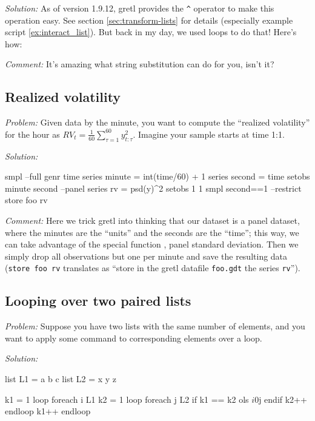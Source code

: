 \emph{Solution:} As of version 1.9.12, gretl provides the
\verb|^| operator to make this operation easy. See section
\ref{sec:transform-lists} for details (especially example script
\ref{ex:interact_list}). But back in my day, we used loops to do that!
Here's how:


\emph{Comment:} It's amazing what string substitution can do for
you, isn't it?

\subsection{Realized volatility}

\emph{Problem:} Given data by the minute, you want to compute the
``realized volatility'' for the hour as $RV_t = 
\sum_{}^{60} y_{t:\tau}^2$. Imagine your sample starts at time 1:1.

\emph{Solution:}
\begin{code}
smpl --full
genr time
series minute = int(time/60) + 1
series second = time %
setobs minute second --panel
series rv = psd(y)^2
setobs 1 1
smpl second==1 --restrict
store foo rv
\end{code}

\emph{Comment:} Here we trick gretl into thinking that our
dataset is a panel dataset, where the minutes are the ``units'' and
the seconds are the ``time''; this way, we can take advantage of the
special function , panel standard deviation.  Then we
simply drop all observations but one per minute and save the resulting
data (\texttt{store foo rv} translates as ``store in the gretl
datafile \texttt{foo.gdt} the series \texttt{rv}'').

\subsection{Looping over two paired lists}

\emph{Problem:} Suppose you have two lists with the same number of
elements, and you want to apply some command to corresponding elements
over a loop.

\emph{Solution:}
\begin{code}
list L1 = a b c
list L2 = x y z

k1 = 1
loop foreach i L1
    k2 = 1
    loop foreach j L2
        if k1 == k2
            ols $i 0 $j
        endif
        k2++
    endloop
    k1++
endloop
\end{code}


